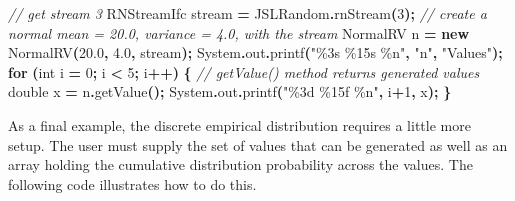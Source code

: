 \documentclass[
]{book}
\newenvironment{Shaded}{\begin{snugshade}}{\end{snugshade}}
\newcommand{\BuiltInTok}[1]{#1}
\newcommand{\CommentTok}[1]{\textcolor[rgb]{0.56,0.35,0.01}{\textit{#1}}}
\newcommand{\ControlFlowTok}[1]{\textcolor[rgb]{0.13,0.29,0.53}{\textbf{#1}}}
\newcommand{\DataTypeTok}[1]{\textcolor[rgb]{0.13,0.29,0.53}{#1}}
\newcommand{\DecValTok}[1]{\textcolor[rgb]{0.00,0.00,0.81}{#1}}
\newcommand{\FloatTok}[1]{\textcolor[rgb]{0.00,0.00,0.81}{#1}}
\newcommand{\FunctionTok}[1]{\textcolor[rgb]{0.00,0.00,0.00}{#1}}
\newcommand{\KeywordTok}[1]{\textcolor[rgb]{0.13,0.29,0.53}{\textbf{#1}}}
\newcommand{\NormalTok}[1]{#1}
\newcommand{\OperatorTok}[1]{\textcolor[rgb]{0.81,0.36,0.00}{\textbf{#1}}}
\newcommand{\SpecialCharTok}[1]{\textcolor[rgb]{0.00,0.00,0.00}{#1}}
\newcommand{\StringTok}[1]{\textcolor[rgb]{0.31,0.60,0.02}{#1}}
\theoremstyle{definition}
\theoremstyle{definition}
\theoremstyle{definition}
\theoremstyle{definition}
\theoremstyle{remark}
\begin{document}
\begin{Shaded}
\begin{Highlighting}[]
\CommentTok{// get stream 3}
\NormalTok{RNStreamIfc stream }\OperatorTok{=}\NormalTok{ JSLRandom}\OperatorTok{.}\FunctionTok{rnStream}\OperatorTok{(}\DecValTok{3}\OperatorTok{);}
\CommentTok{// create a normal mean = 20.0, variance = 4.0, with the stream}
\NormalTok{NormalRV n }\OperatorTok{=} \KeywordTok{new} \FunctionTok{NormalRV}\OperatorTok{(}\FloatTok{20.0}\OperatorTok{,} \FloatTok{4.0}\OperatorTok{,}\NormalTok{ stream}\OperatorTok{);}
\BuiltInTok{System}\OperatorTok{.}\FunctionTok{out}\OperatorTok{.}\FunctionTok{printf}\OperatorTok{(}\StringTok{"}\SpecialCharTok{\%3s}\StringTok{ }\SpecialCharTok{\%15s}\StringTok{ }\SpecialCharTok{\%n}\StringTok{"}\OperatorTok{,} \StringTok{"n"}\OperatorTok{,} \StringTok{"Values"}\OperatorTok{);}
\ControlFlowTok{for} \OperatorTok{(}\DataTypeTok{int}\NormalTok{ i }\OperatorTok{=} \DecValTok{0}\OperatorTok{;}\NormalTok{ i }\OperatorTok{\textless{}} \DecValTok{5}\OperatorTok{;}\NormalTok{ i}\OperatorTok{++)} \OperatorTok{\{}
    \CommentTok{// getValue() method returns generated values}
    \DataTypeTok{double}\NormalTok{ x }\OperatorTok{=}\NormalTok{ n}\OperatorTok{.}\FunctionTok{getValue}\OperatorTok{();}
    \BuiltInTok{System}\OperatorTok{.}\FunctionTok{out}\OperatorTok{.}\FunctionTok{printf}\OperatorTok{(}\StringTok{"}\SpecialCharTok{\%3d}\StringTok{ }\SpecialCharTok{\%15f}\StringTok{ }\SpecialCharTok{\%n}\StringTok{"}\OperatorTok{,}\NormalTok{ i}\OperatorTok{+}\DecValTok{1}\OperatorTok{,}\NormalTok{ x}\OperatorTok{);}
\OperatorTok{\}}
\end{Highlighting}
\end{Shaded}

As a final example, the discrete empirical distribution requires a little more setup. The user must supply the set of values that can be generated as well as an array holding the cumulative distribution probability across the values. The following code illustrates how to do this.
\end{document}
